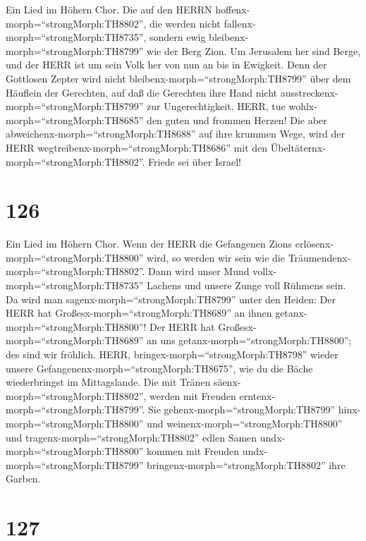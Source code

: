  Ein Lied im Höhern Chor. Die auf den HERRN
hoffenx-morph=``strongMorph:TH8802'', die werden nicht
fallenx-morph=``strongMorph:TH8735'', sondern ewig
bleibenx-morph=``strongMorph:TH8799'' wie der Berg Zion.  Um
Jerusalem her sind Berge, und der HERR ist um sein Volk her von nun an
bis in Ewigkeit.  Denn der Gottlosen Zepter wird nicht
bleibenx-morph=``strongMorph:TH8799'' über dem Häuflein der Gerechten,
auf daß die Gerechten ihre Hand nicht
ausstreckenx-morph=``strongMorph:TH8799'' zur Ungerechtigkeit.
 HERR, tue wohlx-morph=``strongMorph:TH8685'' den guten und
frommen Herzen!  Die aber
abweichenx-morph=``strongMorph:TH8688'' auf ihre krummen Wege, wird der
HERR wegtreibenx-morph=``strongMorph:TH8686'' mit den
Übeltäternx-morph=``strongMorph:TH8802''. Friede sei über Israel!

\hypertarget{section-125}{%
\section{126}\label{section-125}}

 Ein Lied im Höhern Chor. Wenn der HERR die Gefangenen Zions
erlösenx-morph=``strongMorph:TH8800'' wird, so werden wir sein wie die
Träumendenx-morph=``strongMorph:TH8802''.  Dann wird unser
Mund vollx-morph=``strongMorph:TH8735'' Lachens und unsere Zunge voll
Rühmens sein. Da wird man sagenx-morph=``strongMorph:TH8799'' unter den
Heiden: Der HERR hat Großesx-morph=``strongMorph:TH8689'' an ihnen
getanx-morph=``strongMorph:TH8800''!  Der HERR hat
Großesx-morph=``strongMorph:TH8689'' an uns
getanx-morph=``strongMorph:TH8800''; des sind wir fröhlich. 
HERR, bringex-morph=``strongMorph:TH8798'' wieder unsere
Gefangenenx-morph=``strongMorph:TH8675'', wie du die Bäche wiederbringst
im Mittagslande.  Die mit Tränen
säenx-morph=``strongMorph:TH8802'', werden mit Freuden
erntenx-morph=``strongMorph:TH8799''.  Sie
gehenx-morph=``strongMorph:TH8799'' hinx-morph=``strongMorph:TH8800''
und weinenx-morph=``strongMorph:TH8800'' und
tragenx-morph=``strongMorph:TH8802'' edlen Samen
undx-morph=``strongMorph:TH8800'' kommen mit Freuden
undx-morph=``strongMorph:TH8799'' bringenx-morph=``strongMorph:TH8802''
ihre Garben.

\hypertarget{section-126}{%
\section{127}\label{section-126}}

